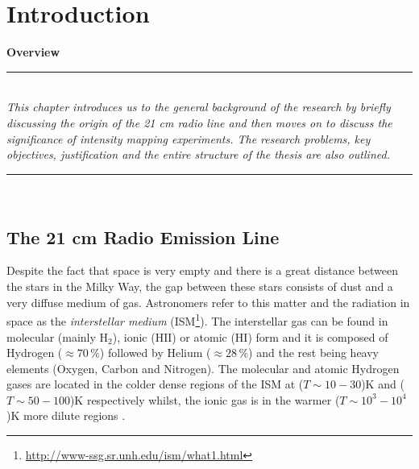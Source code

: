 
\chapter{Introduction}\label{Chapter1} %



\newcommand{\keyword}[1]{\textbf{#1}}
\newcommand{\tabhead}[1]{\textbf{#1}}
\newcommand{\code}[1]{\texttt{#1}}
\newcommand{\file}[1]{\texttt{\bfseries#1}}
\newcommand{\option}[1]{\texttt{\itshape#1}}

\textbf{Overview}\\
\par\noindent\rule{\textwidth}{0.4pt}\\
\textit{This chapter introduces us to the general background of the research by briefly discussing the origin of the 21 cm radio line
and then moves on to discuss the significance of intensity mapping experiments. The research problems, key objectives, justification and the entire structure of the thesis 
are also outlined.}
\par\noindent\rule{\textwidth}{0.4pt}\\
%
\section{The 21 cm Radio Emission Line}	   \label{chap1:21cm}		
Despite the fact that space is very empty and there is a great distance between the stars in the Milky Way, the gap between these
stars consists of dust and a very diffuse medium of gas. Astronomers refer to this matter and the radiation in space  as the \emph{interstellar medium} (ISM\footnote{\url{http://www-ssg.sr.unh.edu/ism/what1.html}}). The  interstellar gas can be found in molecular (mainly $\mathrm{H_{2}}$), ionic ($\mathrm{HII}$) or atomic (HI) form and 
it is composed of Hydrogen ($\approx 70\,\%$) followed by Helium ($\approx 28\,\%$) and the rest being heavy elements (Oxygen, Carbon and Nitrogen). 
The molecular and atomic Hydrogen gases are located in the colder dense regions of the ISM at ($T \sim {10-30}$)K and ($T \sim 50-100$)K respectively whilst, the ionic gas is in the warmer ($T \sim  {10^{3} - 10^{4}}$)K more dilute regions \citep{knee2001massive}.

